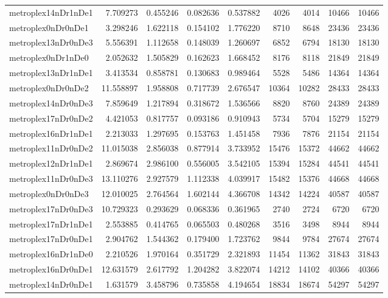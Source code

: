 \begin{longtable}{|l|r|r|r|r|r|r|r|r|}
metroplex14nDr1nDe1 & 7.709273 & 0.455246 & 0.082636 & 0.537882 & 4026 & 4014 & 10466 & 10466 \\
metroplex0nDr0nDe1 & 3.298246 & 1.622118 & 0.154102 & 1.776220 & 8710 & 8648 & 23436 & 23436 \\
metroplex13nDr0nDe3 & 5.556391 & 1.112658 & 0.148039 & 1.260697 & 6852 & 6794 & 18130 & 18130 \\
metroplex0nDr1nDe0 & 2.052632 & 1.505829 & 0.162623 & 1.668452 & 8176 & 8118 & 21849 & 21849 \\
metroplex13nDr1nDe1 & 3.413534 & 0.858781 & 0.130683 & 0.989464 & 5528 & 5486 & 14364 & 14364 \\
metroplex0nDr0nDe2 & 11.558897 & 1.958808 & 0.717739 & 2.676547 & 10364 & 10282 & 28433 & 28433 \\
metroplex14nDr0nDe3 & 7.859649 & 1.217894 & 0.318672 & 1.536566 & 8820 & 8760 & 24389 & 24389 \\
metroplex17nDr0nDe2 & 4.421053 & 0.817757 & 0.093186 & 0.910943 & 5734 & 5704 & 15279 & 15279 \\
metroplex16nDr1nDe1 & 2.213033 & 1.297695 & 0.153763 & 1.451458 & 7936 & 7876 & 21154 & 21154 \\
metroplex11nDr0nDe2 & 11.015038 & 2.856038 & 0.877914 & 3.733952 & 15476 & 15372 & 44662 & 44662 \\
metroplex12nDr1nDe1 & 2.869674 & 2.986100 & 0.556005 & 3.542105 & 15394 & 15284 & 44541 & 44541 \\
metroplex11nDr0nDe3 & 13.110276 & 2.927579 & 1.112338 & 4.039917 & 15482 & 15376 & 44668 & 44668 \\
metroplex0nDr0nDe3 & 12.010025 & 2.764564 & 1.602144 & 4.366708 & 14342 & 14224 & 40587 & 40587 \\
metroplex17nDr0nDe3 & 10.729323 & 0.293629 & 0.068336 & 0.361965 & 2740 & 2724 & 6720 & 6720 \\
metroplex17nDr1nDe1 & 2.553885 & 0.414765 & 0.065503 & 0.480268 & 3516 & 3498 & 8944 & 8944 \\
metroplex17nDr0nDe1 & 2.904762 & 1.544362 & 0.179400 & 1.723762 & 9844 & 9784 & 27674 & 27674 \\
metroplex16nDr1nDe0 & 2.210526 & 1.970164 & 0.351729 & 2.321893 & 11454 & 11362 & 31843 & 31843 \\
metroplex16nDr0nDe1 & 12.631579 & 2.617792 & 1.204282 & 3.822074 & 14212 & 14102 & 40366 & 40366 \\
metroplex14nDr0nDe1 & 1.631579 & 3.458796 & 0.735858 & 4.194654 & 18834 & 18674 & 54297 & 54297 \\

\end{longtable}

